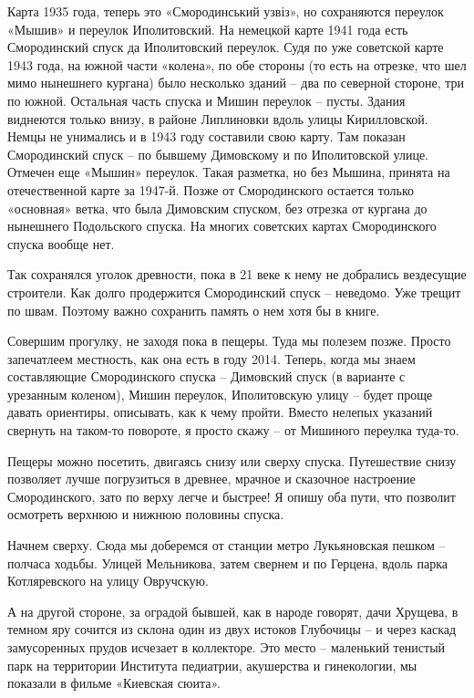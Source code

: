 Карта 1935 года, теперь это «Смородинський узвіз», но сохраняются переулок «Мышив» и переулок Иполитовский. На немецкой карте 1941 года есть Смородинский спуск да Иполитовский переулок. Судя по уже советской карте 1943 года, на южной части «колена», по обе стороны (то есть на отрезке, что шел мимо нынешнего кургана) было несколько зданий – два по северной стороне, три по южной. Остальная часть спуска и Мишин переулок – пусты. Здания виднеются только внизу, в районе Липлиновки вдоль улицы Кирилловской. Немцы не унимались и в 1943 году составили свою карту. Там показан Смородинский спуск – по бывшему Димовскому и по Иполитовской улице. Отмечен еще «Мышин» переулок. Такая разметка, но без Мышина, принята на отечественной карте за 1947-й. Позже от Смородинского остается только «основная» ветка, что была Димовским спуском, без отрезка от кургана до нынешнего Подольского спуска. На многих советских картах Смородинского спуска вообще нет.

Так сохранялся уголок древности, пока в 21 веке к нему не добрались вездесущие строители. Как долго продержится Смородинский спуск – неведомо. Уже трещит по швам. Поэтому важно сохранить память о нем хотя бы в книге.

Совершим прогулку, не заходя пока в пещеры. Туда мы полезем позже. Просто запечатлеем местность, как она есть в году 2014. Теперь, когда мы знаем составляющие Смородинского спуска – Димовский спуск (в варианте с урезанным коленом), Мишин переулок, Иполитовскую улицу – будет проще давать ориентиры, описывать, как к чему пройти. Вместо нелепых указаний свернуть на таком-то повороте, я просто скажу – от Мишиного переулка туда-то. 

Пещеры можно посетить, двигаясь снизу или сверху спуска. Путешествие снизу позволяет лучше погрузиться в древнее, мрачное и сказочное настроение Смородинского, зато по верху легче и быстрее! Я опишу оба пути, что позволит осмотреть верхнюю и нижнюю половины спуска.

Начнем сверху. Сюда мы доберемся от станции метро Лукьяновская пешком – полчаса ходьбы. Улицей Мельникова, затем свернем и по Герцена, вдоль парка Котляревского на улицу Овручскую. 


А на другой стороне, за оградой бывшей, как в народе говорят, дачи Хрущева, в темном яру сочится из склона один из двух истоков Глубочицы – и через каскад замусоренных прудов исчезает в коллекторе. Это место – маленький тенистый парк на территории Института педиатрии, акушерства и гинекологии, мы показали в фильме «Киевская сюита». 

